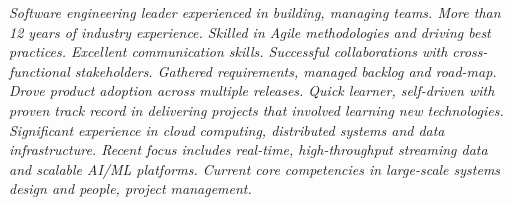 {\selectfont
	\begin{justify}\textit{Software engineering leader experienced in building, managing teams. More than 12 years of industry experience. Skilled in Agile methodologies and driving best practices. Excellent communication skills. Successful collaborations with cross-functional stakeholders. Gathered requirements, managed backlog and road-map. Drove product adoption across multiple releases. Quick learner, self-driven with proven track record in delivering projects that involved learning new technologies. Significant experience in cloud computing, distributed systems and data infrastructure. Recent focus includes real-time, high-throughput streaming data and scalable AI/ML platforms. Current core competencies in large-scale systems design and people, project management.}\end{justify}
}